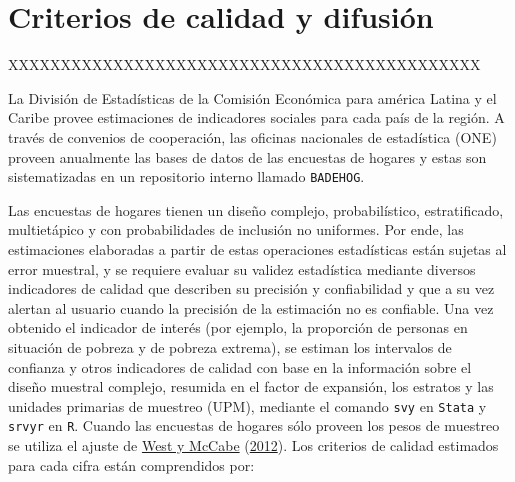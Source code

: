 \documentclass[
  12pt,
  spanish,
]{book}
\begin{document}
\hypertarget{criterios-de-calidad-y-difusiuxf3n}{%
\chapter{Criterios de calidad y difusión}\label{criterios-de-calidad-y-difusiuxf3n}}

XXXXXXXXXXXXXXXXXXXXXXXXXXXXXXXXXXXXXXXXXXXXX

La División de Estadísticas de la Comisión Económica para américa Latina y el Caribe provee estimaciones de indicadores sociales para cada país de la región. A través de convenios de cooperación, las oficinas nacionales de estadística (ONE) proveen anualmente las bases de datos de las encuestas de hogares y estas son sistematizadas en un repositorio interno llamado \texttt{BADEHOG}.

Las encuestas de hogares tienen un diseño complejo, probabilístico, estratificado, multietápico y con probabilidades de inclusión no uniformes. Por ende, las estimaciones elaboradas a partir de estas operaciones estadísticas están sujetas al error muestral, y se requiere evaluar su validez estadística mediante diversos indicadores de calidad que describen su precisión y confiabilidad y que a su vez alertan al usuario cuando la precisión de la estimación no es confiable. Una vez obtenido el indicador de interés (por ejemplo, la proporción de personas en situación de pobreza y de pobreza extrema), se estiman los intervalos de confianza y otros indicadores de calidad con base en la información sobre el diseño muestral complejo, resumida en el factor de expansión, los estratos y las unidades primarias de muestreo (UPM), mediante el comando \texttt{svy} en \texttt{Stata} y \texttt{srvyr} en \texttt{R}. Cuando las encuestas de hogares sólo proveen los pesos de muestreo se utiliza el ajuste de \protect\hyperlink{ref-West_McCabe_2012}{West y McCabe} (\protect\hyperlink{ref-West_McCabe_2012}{2012}). Los criterios de calidad estimados para cada cifra están comprendidos por:
\end{document}
